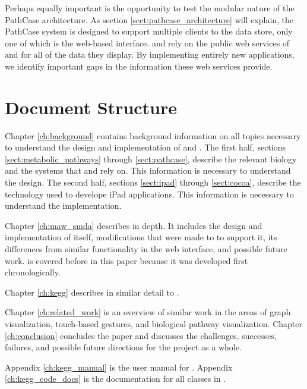 Perhaps equally important is the opportunity to test the modular nature of the
PathCase architecture. As section \ref{sect:pathcase_architecture} will explain,
the PathCase system is designed to support multiple clients to the data store,
only one of which is the web-based interface. \keggapp and \mawapp rely on the
public web services of \pathcasekegg and \pathcasemaw for all of the data they
display. By implementing entirely new applications, we identify important gaps
in the information these web services provide.

\section{Document Structure}

Chapter \ref{ch:background} contains background information on all topics
necessary to understand the design and implementation of \keggapp and \mawapp.
The first half, sections \ref{sect:metabolic_pathways} through
\ref{sect:pathcase}, describe the relevant biology and the systems that \keggapp
and \mawapp rely on. This information is necessary to understand the design. The
second half, sections \ref{sect:ipad} through \ref{sect:cocoa}, describe the
technology used to develope iPad applications. This information is necessary to
understand the implementation.

Chapter \ref{ch:maw_smda} describes \mawapp in depth. It includes the design and
implementation of \mawapp itself, modifications that were made to \pathcasemaw
to support it, its differences from similar functionality in the \pathcasemaw
web interface, and possible future work. \mawapp is covered before \keggapp
in this paper because it was developed first chronologically.

Chapter \ref{ch:kegg} describes \keggapp in similar detail to \mawapp.

Chapter \ref{ch:related_work} is an overview of similar work in the areas of
graph visualization, touch-based gestures, and biological pathway visualization.
Chapter \ref{ch:conclusion} concludes the paper and discusses the challenges,
successes, failures, and possible future directions for the project as a whole.

Appendix \ref{ch:kegg_manual} is the user manual for \keggapp. Appendix
\ref{ch:kegg_code_docs} is the documentation for all classes in \keggapp.
